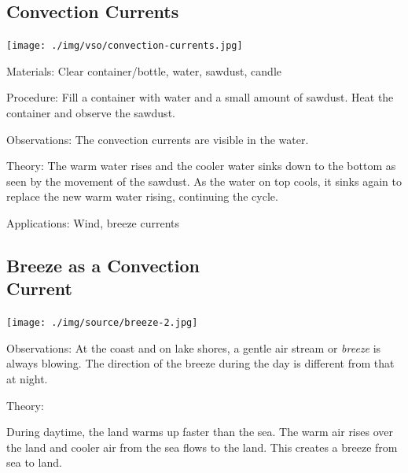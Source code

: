 \begin{multicols}{2}
\columnbreak

\subsection{Convection Currents}

\begin{center}
\texttt{[image: ./img/vso/convection-currents.jpg]}
\end{center}

\begin{description*}
\item[Materials:]{Clear container/bottle, water, sawdust, candle}
\item[Procedure:]{Fill a container with water and a small amount of sawdust. Heat the container and observe the sawdust.}
\item[Observations:]{The convection currents are visible in the water.}
\item[Theory:]{The warm water rises and the cooler water sinks down to the bottom as seen by the movement of the sawdust. As the water on top cools, it sinks again to replace the new warm water rising, continuing the cycle.}
\item[Applications:]{Wind, breeze currents}
\end{description*}

\subsection[Breeze as a Convection Current]{Breeze as a Convection \hfill \\ Current}

\begin{center}
\texttt{[image: ./img/source/breeze-2.jpg]}
\end{center}

\begin{description*}
\item[Observations:]{At the coast and on lake shores, a gentle air stream or \emph{breeze} is always blowing. The direction of the breeze during the day is different from that at night.}
\item[Theory:]{During daytime, the land warms up faster than the sea. The warm air rises over the land and cooler air from the sea flows to the land. This creates a breeze from sea to land.

}
\end{description*}
\end{multicols}
